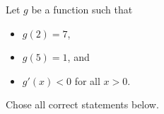 \documentclass{ximera}
\author{Nela Lakos \and Kyle Parsons}
\begin{document}
\begin{exercise}

Let $g$ be a function such that 
\begin{itemize}
\item $g(2) = 7$,
\item $g(5) = 1$, and
\item $g'(x) < 0$ for all $x>0$.
\end{itemize}

Chose all correct statements below.
\begin{selectAll}
\end{selectAll}

\end{exercise}
\end{document}
